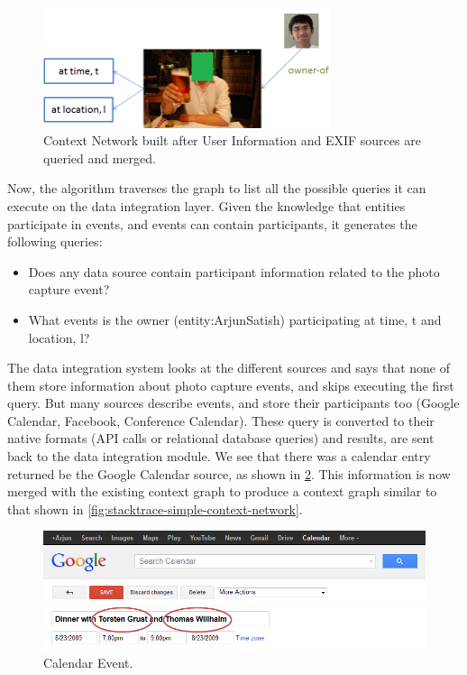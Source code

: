 \begin{figure}[h]
\centering
\includegraphics[width=0.75\textwidth]{media/chapter4/stacktrace/init-network.png}
\caption{Context Network built after User Information and EXIF sources are queried and merged.}
\label{fig:exif-network}
\end{figure}

Now, the algorithm traverses the graph to list all the possible queries it can execute on the data integration layer. Given the knowledge that entities participate in events, and events can contain participants, it generates the following queries:

\begin{itemize}
\item Does any data source contain participant information related to the photo capture event?
\item What events is the owner (entity:ArjunSatish) participating at time, t and location, l?
\end{itemize}

The data integration system looks at the different sources and says that none of them store information about photo capture events, and skips executing the first query. But many sources describe events, and store their participants too (Google Calendar, Facebook, Conference Calendar). These query is converted to their native formats (API calls or relational database queries) and results, are sent back to the data integration module. We see that there was a calendar entry returned be the Google Calendar source, as shown in \ref{fig:stacktrace-simple-calendar}. This information is now merged with the existing context graph to produce a context graph similar to that shown in \ref{fig:stacktrace-simple-context-network}.

\begin{figure}[h]
\centering
\includegraphics[width=\textwidth]{media/chapter4/stacktrace/calendar.png}
\caption{Calendar Event.}
\label{fig:stacktrace-simple-calendar}
\end{figure}

